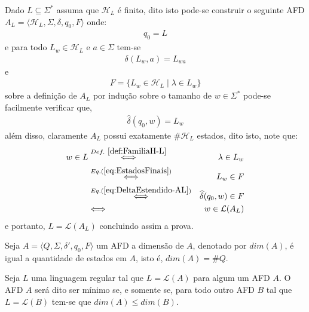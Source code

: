 \begin{prova}
	Dado $L \subseteq \Sigma^*$ assuma que $\mathcal{H}_L$ é finito, dito isto pode-se construir o seguinte AFD $A_L = \langle \mathcal{H}_L, \Sigma, \delta, q_0, F \rangle$ onde:
	\begin{eqnarray}\label{eq:EstadoInicial}
		q_0 = L
	\end{eqnarray}
	e para todo $L_w \in \mathcal{H}_L$ e $a \in \Sigma$ tem-se
	\begin{eqnarray}\label{eq:Delta-AL}
		\delta(L_w, a) = L_{wa}
	\end{eqnarray}
	e
	\begin{eqnarray}\label{eq:EstadosFinais}
		F = \{L_w \in \mathcal{H}_L \mid \lambda \in L_w\}
	\end{eqnarray}
	sobre a definição de $A_L$ por indução sobre o tamanho de $w \in \Sigma^*$ pode-se facilmente verificar que, 
	\begin{eqnarray}\label{eq:DeltaEstendido-AL}
		\widehat{\delta}(q_0, w) = L_w
	\end{eqnarray}
	além disso, claramente $A_L$ possui exatamente $\#\mathcal{H}_L$ estados, dito isto, note que:
	\begin{eqnarray*}
		w \in L & \stackrel{Def. \ \ref{def:FamiliaH-L}}{\Longleftrightarrow} & \lambda \in L_w\\
		& \stackrel{Eq. (\ref{eq:EstadosFinais})}{\Longleftrightarrow} & L_w \in F\\
		& \stackrel{Eq. (\ref{eq:DeltaEstendido-AL})}{\Longleftrightarrow} & \widehat{\delta}(q_0, w) \in F\\
		& \Longleftrightarrow & w \in \mathcal{L}(A_L)
	\end{eqnarray*}
	e portanto, $L = \mathcal{L}(A_L)$ concluindo assim a prova.
\end{prova}

\begin{definicao}
	Seja $A = \langle Q, \Sigma, \delta', q_0, F \rangle$ um AFD a dimensão de $A$, denotado por $dim(A)$, é igual a quantidade de estados em $A$, isto é, $dim(A) = \# Q$. 
\end{definicao}

\begin{definicao}
	Seja $L$ uma linguagem regular tal que $L = \mathcal{L}(A)$ para algum um AFD $A$. O AFD $A$ será dito ser mínimo se, e somente se,  para todo outro AFD $B$ tal que $L= \mathcal{L}(B)$ tem-se que $dim(A) \leq dim(B)$. 
\end{definicao}


